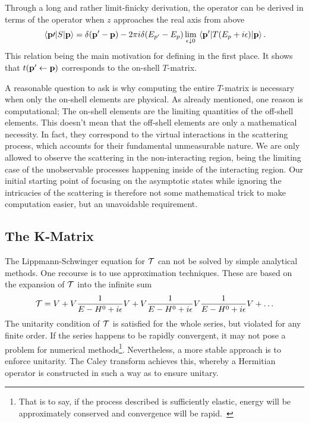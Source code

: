 Through a long and rather limit-finicky derivation, the  operator can be
derived in terms of the  operator when \(z\) approaches the real axis
from above
\begin{equation*}
  \mel{\vb{p}\prime}{S}{\vb{p}} = \delta(\vb{p}^{\prime}-\vb{p}) -2\pi i\delta(E_{p^{\prime}}-E_{p})
  \lim_{\epsilon\downarrow 0}\mel{\vb{p}^{\prime}}{T(E_{p}+i\epsilon)}{\vb{p}}.
\end{equation*}
This relation being the main motivation for defining  in the first
place. It shows that \(t(\vb{p}^{\prime}\leftarrow\vb{p})\) corresponds to the
on-shell \(T\)-matrix.

A reasonable question to ask is why computing the entire \(T\)-matrix is
necessary when only the on-shell elements are physical. As already mentioned,
one reason is computational; The on-shell elements are the limiting quantities
of the off-shell elements. This doesn't mean that the off-shell elements are
only a mathematical necessity. In fact, they correspond to the virtual
interactions in the scattering process, which accounts for their fundamental
unmeasurable nature. We are only allowed to observe the scattering in the
non-interacting region, being the limiting case of the unobservable processes
happening inside of the interacting region. Our initial starting point of
focusing on the asymptotic states while ignoring the intricacies of the
scattering is therefore not some mathematical trick to make computation easier,
but an unavoidable requirement.

\subsection{The K-Matrix}

The Lippmann-Schwinger equation for \(\mathcal{T}\) can not be solved by simple
analytical methods. One recourse is to use approximation techniques. These are
based on the expansion of \(\mathcal{T}\) into the 
infinite sum
\begin{equation*}
  \mathcal{T} = V + V \frac{1}{E-H^{0}+i\epsilon}V + V \frac{1}{E-H^{0}+i\epsilon}V \frac{1}{E-H^{0}+i\epsilon} V+\ldots
\end{equation*}
The unitarity condition of \(\mathcal{T}\) is satisfied for the whole series, but
violated for any finite order. If the series happens to be rapidly convergent,
it may not pose a problem for numerical methods\footnote{That is to say, if the
  process described is sufficiently elastic, energy will be approximately
  conserved and convergence will be rapid.~\cite{Le_Ru_2013}}. Nevertheless, a more stable
approach is to enforce unitarity. The Caley 
transform achieves this, whereby a Hermitian operator is constructed in such a way as to
ensure unitary.


